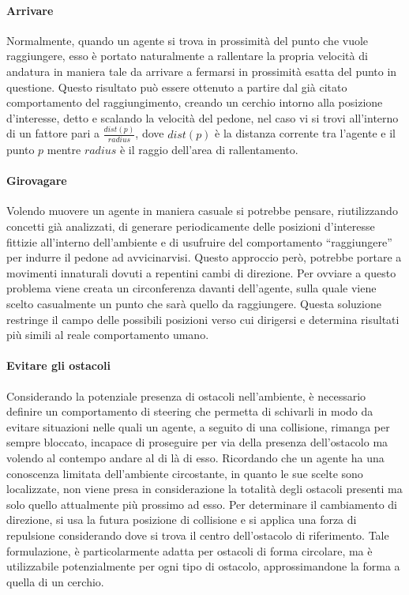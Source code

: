 \paragraph{Arrivare} 
Normalmente, quando un agente si trova in prossimità del punto che vuole raggiungere, esso è portato naturalmente a rallentare la propria velocità di andatura in maniera tale da arrivare a fermarsi in prossimità esatta del punto in questione. Questo risultato può essere ottenuto a partire dal già citato comportamento del raggiungimento, creando un cerchio intorno alla posizione d'interesse, detto  e scalando la velocità del pedone, nel caso vi si trovi all'interno di un fattore pari a $\frac{dist(p)}{radius}$, dove $dist(p)$ è la distanza corrente tra l'agente e il punto $p$ mentre $radius$ è il raggio dell'area di rallentamento.

\paragraph{Girovagare}
Volendo muovere un agente in maniera casuale si potrebbe pensare, riutilizzando concetti già analizzati, di generare periodicamente delle posizioni d'interesse fittizie all'interno dell'ambiente e di usufruire del comportamento \enquote{raggiungere} per indurre il pedone ad avvicinarvisi. Questo approccio però, potrebbe portare a movimenti innaturali dovuti a repentini cambi di direzione. \newline
Per ovviare a questo problema viene creata un circonferenza davanti dell'agente, sulla quale viene scelto casualmente un punto che sarà quello da raggiungere. Questa soluzione restringe il campo delle possibili posizioni verso cui dirigersi e determina risultati più simili al reale comportamento umano.

\paragraph{Evitare gli ostacoli} 
Considerando la potenziale presenza di ostacoli nell'ambiente, è necessario definire un comportamento di steering che permetta di schivarli in modo da evitare situazioni nelle quali un agente, a seguito di una collisione, rimanga per sempre bloccato, incapace di proseguire per via della presenza dell'ostacolo ma volendo al contempo andare al di là di esso. \newline
Ricordando che un agente ha una conoscenza limitata dell'ambiente circostante, in quanto le sue scelte sono localizzate, non viene presa in considerazione la totalità degli ostacoli presenti ma solo quello attualmente più prossimo ad esso. \newline
Per determinare il cambiamento di direzione, si usa la futura posizione di collisione e si applica una forza di repulsione considerando dove si trova il centro dell'ostacolo di riferimento. Tale formulazione, è particolarmente adatta per ostacoli di forma circolare, ma è utilizzabile potenzialmente per ogni tipo di ostacolo, approssimandone la forma a quella di un cerchio.

